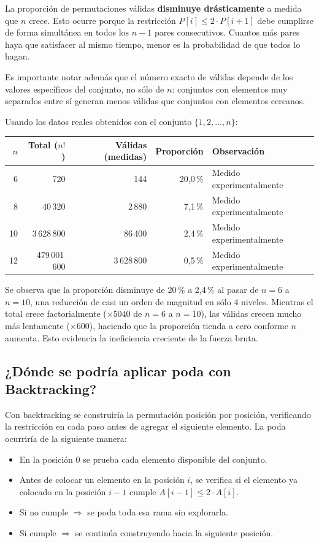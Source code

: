 \documentclass[12pt, a4paper]{article}
\begin{document}
La proporción de permutaciones válidas \textbf{disminuye drásticamente} a medida que
$n$ crece. Esto ocurre porque la restricción $P[i] \leq 2 \cdot P[i+1]$ debe cumplirse
de forma simultánea en todos los $n-1$ pares consecutivos. Cuantos más pares haya que
satisfacer al mismo tiempo, menor es la probabilidad de que todos lo hagan.

Es importante notar además que el número exacto de válidas depende de los valores
específicos del conjunto, no sólo de $n$: conjuntos con elementos muy separados entre
sí generan menos válidas que conjuntos con elementos cercanos.

Usando los datos reales obtenidos con el conjunto $\{1, 2, \ldots, n\}$:

\begin{center}
\begin{tabular}{rrrrl}
\toprule
$n$ & Total ($n!$) & Válidas (medidas) & Proporción & Observación \\
\midrule
6  & 720              & 144       & 20,0\,\% & Medido experimentalmente \\
8  & 40\,320          & 2\,880    &  7,1\,\% & Medido experimentalmente \\
10 & 3\,628\,800      & 86\,400   &  2,4\,\% & Medido experimentalmente \\
12 & 479\,001\,600    & 3\,628\,800 & 0,5\,\% & Medido experimentalmente \\
\bottomrule
\end{tabular}
\end{center}

Se observa que la proporción disminuye de 20\,\% a 2,4\,\% al pasar de $n=6$ a
$n=10$, una reducción de casi un orden de magnitud en sólo 4 niveles. Mientras el
total crece factorialmente ($\times 5040$ de $n=6$ a $n=10$), las válidas crecen
mucho más lentamente ($\times 600$), haciendo que la proporción tienda a cero
conforme $n$ aumenta. Esto evidencia la ineficiencia creciente de la fuerza bruta.

\subsection{¿Dónde se podría aplicar poda con Backtracking?}

Con backtracking se construiría la permutación posición por posición, verificando la
restricción en cada paso antes de agregar el siguiente elemento. La poda ocurriría de
la siguiente manera:

\begin{itemize}
  \item En la posición 0 se prueba cada elemento disponible del conjunto.
  \item Antes de colocar un elemento en la posición $i$, se verifica si el elemento
        ya colocado en la posición $i-1$ cumple $A[i-1] \leq 2 \cdot A[i]$.
  \item Si no cumple $\Rightarrow$ se poda toda esa rama sin explorarla.
  \item Si cumple $\Rightarrow$ se continúa construyendo hacia la siguiente posición.
\end{itemize}
\end{document}
